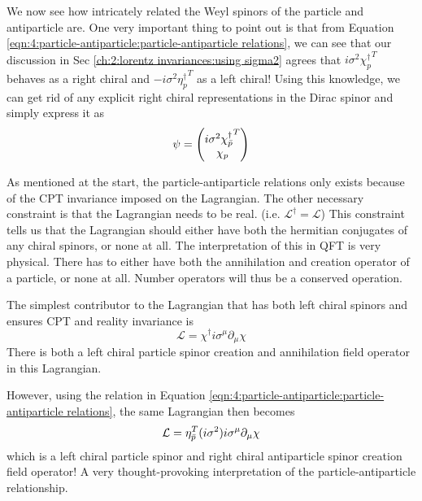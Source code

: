 We now see how intricately related the Weyl spinors of the particle and antiparticle are. One very important thing to point out is that from Equation \ref{eqn:4:particle-antiparticle:particle-antiparticle relations}, we can see that our discussion in Sec \ref{ch:2:lorentz invariances:using sigma2} agrees that $i \sigma^2 {\chi_p^\dagger}^T$ behaves as a right chiral and $- i \sigma^2 {\eta_p^\dagger}^T$ as a left chiral! Using this knowledge, we can get rid of any explicit right chiral representations in the Dirac spinor and simply express it as
\begin{equation}
    \psi = \col{i \sigma^2 {\chi_{\Bar{p}}^\dagger}^T}{\chi_p}
    \label{eqn:4:particle-antiparticle:dirac spinor as left chirals}
    \nonumber
\end{equation}

As mentioned at the start, the particle-antiparticle relations only exists because of the CPT invariance imposed on the Lagrangian. The other necessary constraint is that the Lagrangian needs to be real. (i.e. $\mathcal{L^\dagger} = \mathcal{L}$) This constraint tells us that the Lagrangian should either have both the hermitian conjugates of any chiral spinors, or none at all. The interpretation of this in QFT is very physical. There has to either have both the annihilation and creation operator of a particle, or none at all. Number operators will thus be a conserved operation. 

The simplest contributor to the Lagrangian that has both left chiral spinors and ensures CPT and reality invariance is
\begin{equation*}
    \mathcal{L} = \chi^\dagger i \sigma^\mu \partial_\mu \chi
\end{equation*}
There is both a left chiral particle spinor creation and annihilation field operator in this Lagrangian.

However, using the relation in Equation \ref{eqn:4:particle-antiparticle:particle-antiparticle relations}, the same Lagrangian then becomes
\begin{equation*}
    \mathcal{L} = \eta_{\Bar{p}}^T (i \sigma^2) i \sigma^\mu \partial_\mu \chi
\end{equation*}
which is a left chiral particle spinor and right chiral antiparticle spinor creation field operator! A very thought-provoking interpretation of the particle-antiparticle relationship.

